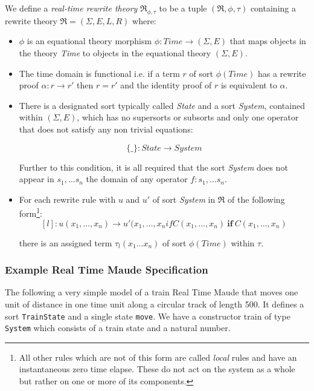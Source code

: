 \medskip
\begin{mydef}
We define a \emph{real-time rewrite theory} $\mathfrak{R}_{\phi,\tau}$ to be a tuple $(\mathfrak{R}, \phi,\tau)$ containing a rewrite theory $\mathfrak{R} = (\Sigma, E,L,R) $ where:

\begin{itemize}
\item $\phi$ is an equational theory morphism $\phi : \mathit{Time} \to (\Sigma, E)$ that maps objects in the theory \textit{Time} to objects in the equational theory $(\Sigma , E)$.

\item The time domain is functional i.e. if a term $r$ of sort $\phi(Time)$  has a rewrite proof $\alpha: r \to r'$ then $r = r'$ and the identity proof of $r$ is equivalent to $\alpha$.

\item There is a designated sort typically called \textit{State} and a sort \textit{System}, contained within $(\Sigma, E)$, which has no supersorts or subsorts and only one operator that does not satisfy any non trivial equations:

$$\{\_\}: State \to System$$

Further to this condition, it is all required that the sort \textit{System} does not appear in $s_1, \ldots s_n$ the domain  of  any operator $f: s_1, \ldots s_n$.

\item For each rewrite rule with $u$ and $u'$ of sort \textit{System} in $\mathfrak{R}$ of the following form\footnote{All other rules which are not of this form are called \emph{local} rules and have an instantaneous zero time elapse. These do not act on the system as a whole but rather on one or more of its components.}:
$$[l]: u(x_1,\ldots ,x_n) \to u'(x_1,\ldots ,x_n if C(x_1, \ldots ,x_n) \ \textbf{if} \ C(x_1, \ldots ,x_n)$$


there is an assigned term $\tau_l(x_1 \ldots x_n)$ of sort $\phi(Time)$ within $\tau$.

\end{itemize}
\end{mydef}
 
\subsubsection*{Example Real Time Maude Specification}
The following a very simple model of a train Real Time Maude that moves one unit of distance in one time unit along a circular track of length 500. It defines a sort \texttt{TrainState} and a single state \texttt{move}. We have a constructor train of type \texttt{System} which consists of a train state and a natural number.  

